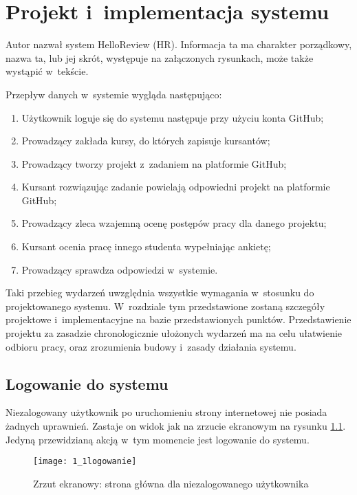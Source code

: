 \chapter{Projekt i~implementacja systemu}

Autor nazwał system HelloReview (HR). Informacja ta ma charakter porządkowy, nazwa ta, lub jej skrót, występuje na załączonych rysunkach, może także wystąpić w~tekście.

Przepływ danych w~systemie wygląda następująco:

\begin{enumerate}
    \item Użytkownik loguje się do systemu następuje przy użyciu konta GitHub;
    \item Prowadzący zakłada kursy, do których zapisuje kursantów;
    \item Prowadzący tworzy projekt z~zadaniem na platformie GitHub;
    \item Kursant rozwiązując zadanie powielają odpowiedni projekt na platformie GitHub;
    \item Prowadzący zleca wzajemną ocenę postępów pracy dla danego projektu;
    \item Kursant ocenia pracę innego studenta wypełniając ankietę;
    \item Prowadzący sprawdza odpowiedzi w~systemie.
\end{enumerate}

Taki przebieg wydarzeń uwzględnia wszystkie wymagania w~stosunku do projektowanego systemu. W~rozdziale tym przedstawione zostaną szczegóły projektowe i~implementacyjne na bazie przedstawionych punktów. Przedstawienie projektu za zasadzie chronologicznie ułożonych wydarzeń ma na celu ułatwienie odbioru pracy, oraz zrozumienia budowy i~zasady działania systemu.

\newpage
\section{Logowanie do systemu}
Niezalogowany użytkownik po uruchomieniu strony internetowej nie posiada żadnych uprawnień. Zastaje on widok jak na zrzucie ekranowym na rysunku \ref{obr11}. Jedyną przewidzianą akcją w~tym momencie jest logowanie do systemu.

\begin{figure}[!h]
\centering
    \texttt{[image: 1\_1logowanie]}
    \caption{Zrzut ekranowy: strona główna dla niezalogowanego użytkownika}
    \label{obr11}
\end{figure}

